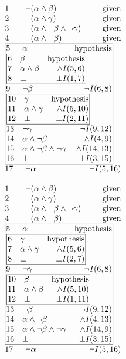 \documentclass[11pt,twoside,a4paper]{report}
\begin{document}
\begin{figure}[htp]
\begin{minipage}[c]{.5\linewidth}
\[\vbox{\offinterlineskip\halign{
&\tabskip=1.5em#\strut&$#$\hfil\tabskip=1em&\hfil$#$\tabskip=0em\cr
%
1&\neg(\alpha\wedge\beta)&\mbox{given}\cr
2&\neg(\alpha\wedge\gamma)&\mbox{given}\cr
3&\neg(\alpha\wedge\neg\beta\wedge\neg\gamma)&\mbox{given}\cr
4&\neg(\alpha\wedge\neg\beta)&\mbox{given}\cr
%
\multispan3\vbox{\halign{
\vrule#&&\hskip.1em\tabskip=1em#\strut&$#$\hfil\tabskip=1em&\hfil$#$\hskip0.1em\tabskip=0em&\vrule#\cr
\noalign{\hrule}
%
&5&\alpha&\mbox{hypothesis}&\cr
%
&\multispan3\,\vbox{\halign{
\vrule#&&\hskip.1em\tabskip=1em#\strut&$#$\hfil\tabskip=1em&\hfil$#$\hskip0.1em\tabskip=0em&\vrule#\cr
\noalign{\hrule}
%
&6&\beta&\mbox{hypothesis}&\cr
&7&\alpha\wedge\beta&\wedge I(5,6)&\cr
&8&\bot&\bot I(1,7)&\cr
%
\noalign{\hrule}}}\,&\cr
%
&9&\neg\beta&\neg I(6,8)&\cr
%
&\multispan3\,\vbox{\halign{
\vrule#&&\hskip.1em\tabskip=1em#\strut&$#$\hfil\tabskip=1em&\hfil$#$\hskip0.1em\tabskip=0em&\vrule#\cr
\noalign{\hrule}
%
&10&\gamma&\mbox{hypothesis}&\cr
&11&\alpha\wedge\gamma&\wedge I(5,10)&\cr
&12&\bot&\bot I(2,11)&\cr
%
\noalign{\hrule}}}\,&\cr
%
&13&\neg\gamma&\neg I(9,12)&\cr
&14&\alpha\wedge\neg\beta&\wedge I(4,9)&\cr
&15&\alpha\wedge\neg\beta\wedge\neg\gamma&\wedge I(14,13)&\cr
&16&\bot&\bot I(3,15)&\cr
%
\noalign{\hrule}}}\,\cr
%
17&\neg\alpha&\neg I(5,16)\cr
}}\]
\end{minipage}%
\begin{minipage}[c]{.5\linewidth}
\[\vbox{\offinterlineskip\halign{
&\tabskip=1.5em#\strut&$#$\hfil\tabskip=1em&\hfil$#$\tabskip=0em\cr
%
1&\neg(\alpha\wedge\beta)&\mbox{given}\cr
2&\neg(\alpha\wedge\gamma)&\mbox{given}\cr
3&\neg(\alpha\wedge\neg\beta\wedge\neg\gamma)&\mbox{given}\cr
4&\neg(\alpha\wedge\neg\beta)&\mbox{given}\cr
%
\multispan3\vbox{\halign{
\vrule#&&\hskip.1em\tabskip=1em#\strut&$#$\hfil\tabskip=1em&\hfil$#$\hskip0.1em\tabskip=0em&\vrule#\cr
\noalign{\hrule}
%
&5&\alpha&\mbox{hypothesis}&\cr
%
&\multispan3\,\vbox{\halign{
\vrule#&&\hskip.1em\tabskip=1em#\strut&$#$\hfil\tabskip=1em&\hfil$#$\hskip0.1em\tabskip=0em&\vrule#\cr
\noalign{\hrule}
%
&6&\gamma&\mbox{hypothesis}&\cr
&7&\alpha\wedge\gamma&\wedge I(5,6)&\cr
&8&\bot&\bot I(2,7)&\cr
%
\noalign{\hrule}}}\,&\cr
%
&9&\neg\gamma&\neg I(6,8)&\cr
%
&\multispan3\,\vbox{\halign{
\vrule#&&\hskip.1em\tabskip=1em#\strut&$#$\hfil\tabskip=1em&\hfil$#$\hskip0.1em\tabskip=0em&\vrule#\cr
\noalign{\hrule}
%
&10&\beta&\mbox{hypothesis}&\cr
&11&\alpha\wedge\beta&\wedge I(5,10)&\cr
&12&\bot&\bot I(1,11)&\cr
%
\noalign{\hrule}}}\,&\cr
%
&13&\neg\beta&\neg I(9,12)&\cr
&14&\alpha\wedge\neg\beta&\wedge I(4,13)&\cr
&15&\alpha\wedge\neg\beta\wedge\neg\gamma&\wedge I(14,9)&\cr
&16&\bot&\bot I(3,15)&\cr
%
\noalign{\hrule}}}\,\cr
%
17&\neg\alpha&\neg I(5,16)\cr
}}\]
\end{minipage}


\end{figure}
\end{document}
